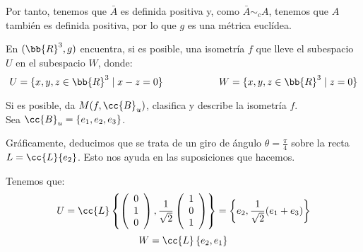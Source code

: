 \documentclass[12pt]{article}
\begin{document}
\begin{ejercicio}
\begin{enumerate}
\begin{description}
        Por tanto, tenemos que $\bar{A}$ es definida positiva y, como $\bar{A}\sim_c A$, tenemos que $A$ también es definida positiva, por lo que $g$ es una métrica euclídea.
    \end{description}

    
\end{enumerate}
    
\end{ejercicio}



\begin{ejercicio}
    En $(\bb{R}^3, g)$ encuentra, si es posible, una isometría $f$ que lleve el subespacio $U$ en el subespacio $W$, donde:
    \begin{equation*}
        U=\{x,y,z\in \bb{R}^3 \mid x-z=0\} \hspace{2cm}
        W=\{x,y,z\in \bb{R}^3 \mid z=0\}
    \end{equation*}

    Si es posible, da $M(f,\cc{B}_u)$, clasifica y describe la isometría $f$.\\

    
    Sea $\cc{B}_u=\{e_1, e_2, e_3\}$.
    \begin{observacion}
    Gráficamente, deducimos que se trata de un giro de ángulo $\theta=\frac{\pi}{4}$ sobre la recta $L=\cc{L}\{e_2\}$. Esto nos ayuda en las suposiciones que hacemos.
    \end{observacion}
    
    \vspace{1cm}


    Tenemos que:
    \begin{equation*}
        U=\cc{L}\left\{
        \left(
        \begin{array}{c}
            0 \\ 1 \\ 0 
        \end{array}
        \right),
        \frac{1}{\sqrt{2}}
        \left(
        \begin{array}{c}
            1 \\ 0 \\ 1
        \end{array}
        \right)
        \right\} = \left\{e_2, \frac{1}{\sqrt{2}}(e_1+e_3)\right\}
    \end{equation*}
    \begin{equation*}
        W = \cc{L}\left\{e_2, e_1\right\}
    \end{equation*}


\end{ejercicio}
\end{document}

